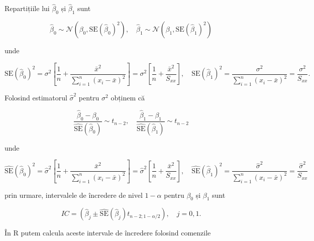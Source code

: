 \documentclass[]{article}
\begin{document}
Repartițiile lui \(\hat\beta_0\) și \(\hat\beta_1\) sunt

\[
\hat\beta_0\sim\mathcal{N}\left(\beta_0,\mathrm{SE}(\hat\beta_0)^2\right),\quad\hat\beta_1\sim\mathcal{N}\left(\beta_1,\mathrm{SE}(\hat\beta_1)^2\right)
\]

unde

\[
\mathrm{SE}(\hat\beta_0)^2=\sigma^2\left[\frac{1}{n}+\frac{\bar x^2}{\sum_{i=1}^{n}(x_i-\bar{x})^2}\right]=\sigma^2\left[\frac{1}{n}+\frac{\bar x^2}{S_{xx}}\right],\quad  \mathrm{SE}(\hat\beta_1)^2= \frac{\sigma^2}{\sum_{i=1}^{n}(x_i-\bar{x})^2} = \frac{\sigma^2}{S_{xx}}.
\]

Folosind estimatorul \(\hat\sigma^2\) pentru \(\sigma^2\) obținem că

\[
\frac{\hat\beta_0-\beta_0}{\hat{\mathrm{SE}}(\hat\beta_0)}\sim t_{n-2},\quad\frac{\hat\beta_1-\beta_1}{\hat{\mathrm{SE}}(\hat\beta_1)}\sim t_{n-2}
\]

unde

\[
\hat{\mathrm{SE}}(\hat\beta_0)^2=\hat \sigma^2\left[\frac{1}{n}+\frac{\bar x^2}{\sum_{i=1}^{n}(x_i-\bar{x})^2}\right]=\hat \sigma^2\left[\frac{1}{n}+\frac{\bar x^2}{S_{xx}}\right],\quad \hat{\mathrm{SE}}(\hat\beta_1)^2=\frac{\hat \sigma^2}{\sum_{i=1}^{n}(x_i-\bar{x})^2} = \frac{\hat \sigma^2}{S_{xx}}
\]

prin urmare, intervalele de încredere de nivel \(1-\alpha\) pentru
\(\beta_0\) și \(\beta_1\) sunt

\[
IC = \left(\hat\beta_j\pm\hat{\mathrm{SE}}(\hat\beta_j)t_{n-2;1-\alpha/2}\right),\quad j=0,1.
\]

În R putem calcula aceste intervale de încredere folosind comenzile
\end{document}
